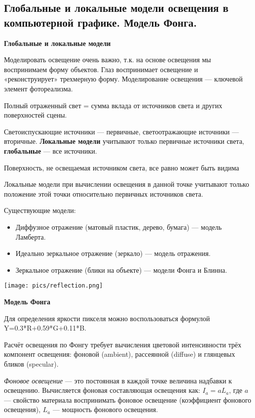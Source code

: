 \subsection{Глобальные и локальные модели освещения в компьютерной графике. Модель Фонга.}

\textbf{Глобальные и локальные модели}

Моделировать освещение очень важно, т.к. на основе освещения мы воспринимаем форму объектов. Глаз воспринимает освещение и «реконструирует» трехмерную форму. Моделирование освещения --- ключевой элемент фотореализма.

Полный отраженный свет = сумма вклада от источников света и других поверхностей сцены.

Светоиспускающие источники --- первичные, светоотражающие источники --- вторичные. 
\textbf{Локальные модели} учитывают только первичные источники
света, \textbf{глобальные} --- все источники. 

Поверхность, не освещаемая источником света, все равно может быть видима

Локальные модели при вычислении освещения в данной точке учитывают только положение этой точки относительно первичных источников света.

Существующие модели:
\begin{itemize}
    \item Диффузное отражение (матовый пластик, дерево, бумага) --- модель Ламберта. 
    \item Идеально зеркальное отражение (зеркало) --- модель отражения.
    \item Зеркальное отражение (блики на объекте) --- модели Фонга и Блинна.
\end{itemize}

\texttt{[image: pics/reflection.png]}

\textbf{Модель Фонга}

Для определения яркости пикселя можно воспользоваться формулой Y=0.3*R+0.59*G+0.11*B.

Расчёт освещения по Фонгу требует вычисления цветовой интенсивности трёх компонент освещения: фоновой (ambient), рассеянной (diffuse) и глянцевых бликов (specular).

\textit{Фоновое освещение} --- это постоянная в каждой точке величина надбавки к освещению. 
Вычисляется фоновая составляющая освещения как: $I_a = a L_a$, где $a$ --- свойство материала воспринимать фоновое освещение (коэффициент фонового освещения), $L_a$ --- мощность фонового освещения.

